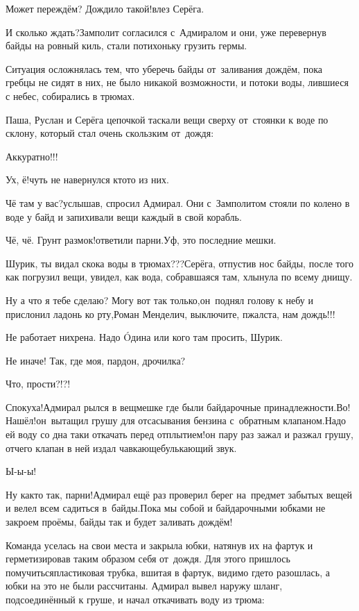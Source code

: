 \diagdash Может переждём? Дождило такой!\mdash влез Серёга.

\diagdash И сколько ждать?\mdash Замполит согласился с~Адмиралом и они, уже перевернув байды на ровный киль, стали потихоньку грузить гермы. 

Ситуация осложнялась тем, что уберечь байды от~заливания дождём, пока гребцы не сидят в них, не было никакой возможности, и потоки воды, лившиеся с небес, собирались в трюмах.

Паша, Руслан и Серёга цепочкой таскали вещи сверху от~стоянки к воде по склону, который стал очень скользким от~дождя:

\diagdash Аккуратно!!!

\diagdash Ух, ё!\mdash чуть не навернулся кто\sdash то из них.

\diagdash Чё там у вас?\mdash услышав, спросил Адмирал. Они с~Замполитом стояли по колено в воде у байд и запихивали вещи каждый в свой корабль.

\diagdash Чё, чё. Грунт размок!\mdash ответили парни.\mdash Уф, это последние мешки.

\diagdash Шурик, ты видал скока воды в трюмах???\mdash Серёга, отпустив нос байды, после того как погрузил вещи, увидел, как вода, собравшаяся там, хлынула по всему днищу.

\diagdash Ну а что я тебе сделаю? Могу вот так только,\mdash он~поднял голову к небу и прислонил ладонь ко рту,\mdash Роман Менделич, выключите, п\sdash жалста, нам дождь!!!

\diagdash Не работает нихрена. Надо {\'{O}}дина или кого там просить, Шурик.

\diagdash Не иначе! Так, где моя, пардон, дрочилка?

\diagdash Что, прости?!?!

\diagdash Спокуха!\mdash Адмирал рылся в вещмешке где были байдарочные принадлежности.\mdash Во! Нашёл!\mdash он~вытащил грушу для отсасывания бензина с~обратным клапаном.\mdash Надо ей воду со дна таки откачать перед отплытием!\mdash он пару раз зажал и разжал грушу, отчего клапан в ней издал чавкающе\sdash булькающий звук.

\diagdash Ы-ы-ы! 

\diagdash Ну как\sdash то так, парни!\mdash Адмирал ещё раз проверил берег на~предмет забытых вещей и велел всем садиться в~байды.\mdash Пока мы собой и байдарочными юбками не закроем проёмы, байды так и будет заливать дождём!

Команда уселась на свои места и закрыла юбки, натянув их на фартук и герметизировав таким образом себя от~дождя. Для этого пришлось помучиться\mdash пластиковая трубка, вшитая в фартук, видимо где\sdash то разошлась, а юбки на это не были рассчитаны. Адмирал вывел наружу шланг, подсоединённый к груше, и начал откачивать воду из трюма:

